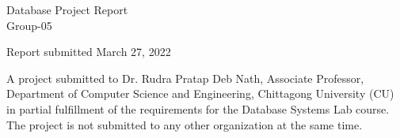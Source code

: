 \begin{titlepage}
\begin{center}
    {\large
      Database Project Report %
    }\\
    \vspace{0.2cm}
    {\Large
      Group-05 %
    }
  \end{center}
  \vfill
  
  \begin{center}
  Report submitted March 27, 2022
  \end{center}
	\vfill
A project submitted to Dr. Rudra Pratap Deb Nath, Associate Professor, Department of Computer Science and Engineering, Chittagong University (CU) in partial fulfillment of the requirements for the Database Systems Lab course. The project is not submitted to any other organization at the same time. 

\end{titlepage}
\clearpage
